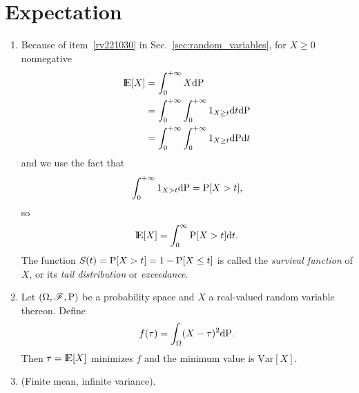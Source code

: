 \documentclass[a4paper,10pt]{article}
\begin{document}
\section{Expectation}
\begin{enumerate}  

\item 
 \label{gx1312}
 Because of item~\ref{rv221030} in Sec.~\ref{sec:random_variables}, for $X\geq 0$ nonnegative 
 \begin{align*}
  \E[X] &= \int_{0}^{+\infty} X \d \prob\\
        &= \int_{0}^{+\infty} \int_0^{+\infty} 1_{X\geq t}\d t \d \prob\\
        &= \int_{0}^{+\infty} \int_0^{+\infty} 1_{X\geq t} \d \prob \d t
 \end{align*}
 and we use the fact that 
 \[
  \int_{0}^{+\infty} 1_{X>t}\mathrm{d} \mathrm{P} = \mathrm{P}[X>t],
 \]
 so
 \[
  \E[X] = \int_0^\infty \prob[X>t]\d t.
 \]
 The function $S(t) = \mathrm{P}[X>t] = 1-\mathrm{P}[X\leq t]$ is called the \textit{survival function} 
 of $X$, or its \textit{tail distribution} or \textit{exceedance}.

 \item Let $(\Omega,\mathscr{F},\mathrm{P})$ be a probability space and $X$ a real-valued random variable thereon. Define 
 \[
  f(\tau) = \int_{\Omega}(X-\tau)^2\mathrm{d}\mathrm{P}.
 \]
 Then $\tau = \E[X]$ minimizes $f$ and the minimum value is $\mathrm{Var}[X]$.
 
 \item (Finite mean, infinite variance).
\end{enumerate}
\end{document}
